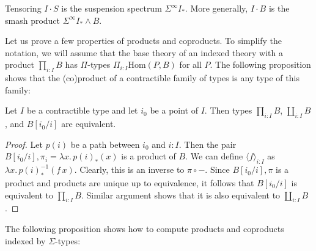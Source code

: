 \documentclass[reqno]{mscs}
\newcommand{\fs}[1]{\mathrm{#1}}
\newcommand{\Hom}{\fs{Hom}}
\newcommand{\sym}[1]{#1^{-1}}
\numberwithin{figure}{section}
\begin{document}
\begin{example}
Tensoring $I \cdot S$ is the suspension spectrum $\Sigma^\infty I_*$.
More generally, $I \cdot B$ is the smash product $\Sigma^\infty I_* \wedge B$.
\end{example}

Let us prove a few properties of products and coproducts.
To simplify the notation, we will assume that the base theory of an indexed theory with a product $\prod_{i : I} B$ has $\Pi$-types $\Pi_{i : I} \Hom(P,B)$ for all $P$.
The following proposition shows that the (co)product of a contractible family of types is any type of this family:

\begin{prop}
Let $I$ be a contractible type and let $i_0$ be a point of $I$.
Then types $\prod_{i : I} B$, $\coprod_{i : I} B$, and $B[i_0/i]$ are equivalent.
\end{prop}
\begin{proof}
Let $p(i)$ be a path between $i_0$ and $i : I$.
Then the pair $B[i_0/i], \pi_i = \lambda x.\,p(i)_*(x)$ is a product of $B$.
We can define $\langle f \rangle_{i : I}$ as $\lambda x.\,\sym{p(i)}_*(f\,x)$.
Clearly, this is an inverse to $\pi \circ -$.
Since $B[i_0/i],\pi$ is a product and products are unique up to equivalence, it follows that $B[i_0/i]$ is equivalent to $\prod_{i : I} B$.
Similar argument shows that it is also equivalent to $\coprod_{i : I} B$.
\end{proof}

The following proposition shows how to compute products and coproducts indexed by $\Sigma$-types:
\end{document}
